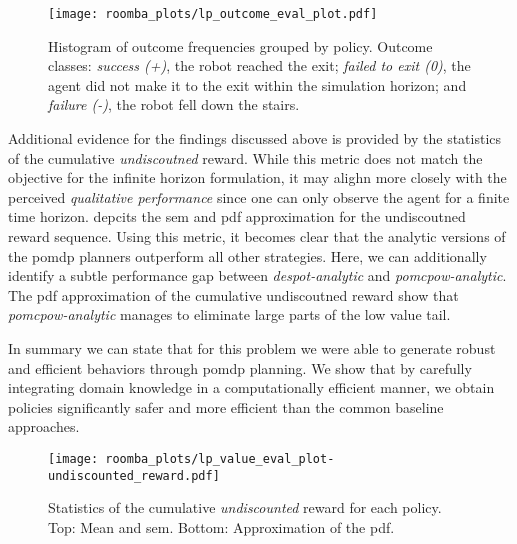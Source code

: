 \begin{figure}[htpb]
  \centering
  \texttt{[image: roomba\_plots/lp\_outcome\_eval\_plot.pdf]}
	\caption{Histogram of outcome frequencies grouped by policy. Outcome
			     classes: \emph{success (+)}, the robot reached the exit; \emph{failed to
				   exit (0)}, the agent did not make it to the exit within the simulation horizon;
		 	 	   and \emph{failure (-)}, the robot fell down the stairs.}
	\label{fig:lp_outcome}
\end{figure}

Additional evidence for the findings discussed above is provided by the
statistics of the cumulative \emph{undiscoutned} reward. While this metric does
not match the objective for the infinite horizon formulation, it may alighn more closely with the
perceived \emph{qualitative performance} since one can only observe the agent
for a finite time horizon.  depcits the \ac{sem}
and \ac{pdf} approximation for the undiscoutned reward sequence. Using this
metric, it becomes clear that the analytic versions of the \ac{pomdp} planners
outperform all other strategies. Here, we can additionally identify a subtle
performance gap between \emph{\ac{despot}-analytic} and
\emph{\ac{pomcpow}-analytic}. The \ac{pdf} approximation of the
cumulative undiscoutned reward show that \emph{\ac{pomcpow}-analytic} manages
to eliminate large parts of the low value tail.

In summary we can state that for this problem we were able to generate robust
and efficient behaviors through \ac{pomdp} planning. We show that by carefully
integrating domain knowledge in a computationally efficient manner, we obtain
policies significantly safer and more efficient than the common baseline
approaches.

\begin{figure}[htpb]
  \centering
  \texttt{[image: roomba\_plots/lp\_value\_eval\_plot-undiscounted\_reward.pdf]}
  \caption{Statistics of the cumulative \emph{undiscounted} reward for each
  policy. Top: Mean and \acf{sem}. Bottom: Approximation of the \acf{pdf}.}
  \label{fig:lp_eval_undiscounted}
\end{figure}

